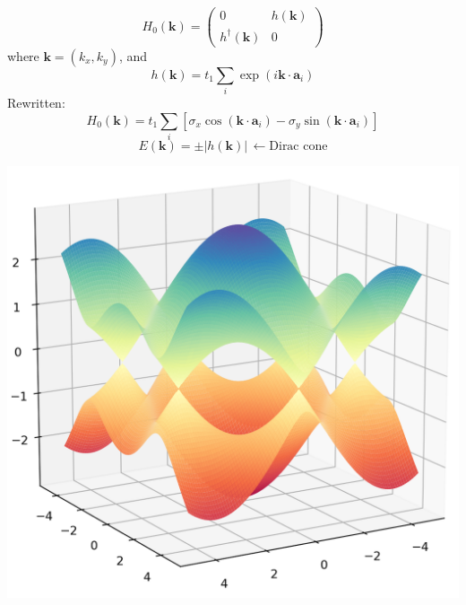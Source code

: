 \documentclass[12pt]{article}
\numberwithin{equation}{section}
\begin{document}
\newpage
\begin{minipage}[c]{0.4\textwidth}
  \begin{equation*}
    H_0(\mathbf{k})= \begin{pmatrix} 0 & h(\mathbf{k}) \\ h^\dagger(\mathbf{k}) & 0 \end{pmatrix}
  \end{equation*}
  where $\mathbf{k}=(k_x, k_y)$, and
  \begin{equation*}
    h(\mathbf{k}) = t_1\sum_i\exp\left(i\mathbf{k}\cdot\mathbf{a}_i\right)
  \end{equation*}
  Rewritten: 
  \begin{equation*}
    H_0(\mathbf{k}) = t_1\sum_i\left[\sigma_x\cos(\mathbf{k}\cdot\mathbf{a}_i)-\sigma_y \sin(\mathbf{k}\cdot\mathbf{a}_i)\right]
  \end{equation*}
  \begin{equation*}
    E(\mathbf{k}) = \pm \left|h(\mathbf{k})\right| \,\leftarrow \textrm{Dirac cone}
  \end{equation*}
\end{minipage}
\hfill
\begin{minipage}[c]{0.6\textwidth}
  \includegraphics[width=\textwidth]{./media/bulk_graphene_bands_3d_cropped.png}
\end{minipage}
\end{document}
